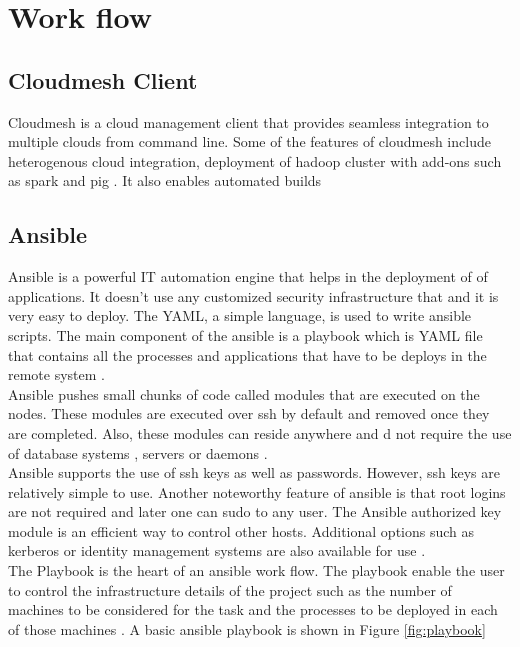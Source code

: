 \documentclass[9pt,twocolumn,twoside]{../../styles/osajnl}
\begin{document}
\section{Work flow}

\subsection{Cloudmesh Client}
Cloudmesh is a cloud management client that provides seamless integration to multiple clouds from command line. Some of the features of cloudmesh include heterogenous cloud integration, deployment of hadoop cluster with add-ons such as spark and pig \cite{www-cm-git}. It also enables automated builds 

\subsection{Ansible}
Ansible is a powerful IT automation engine that helps in the deployment of of applications. It doesn't use any customized security infrastructure that and it is very easy to deploy. The YAML, a simple language, is used to write ansible scripts. The main component of the ansible is a playbook which is YAML file that contains all the processes and applications that have to be deploys in the remote system \cite{www-ansible}. \\
Ansible pushes small chunks of code called modules that are executed on the nodes. These modules are executed over ssh by default and removed once they are completed. Also, these modules can reside anywhere and d not require the use of database systems , servers or daemons \cite{www-ansible}.\\
Ansible supports the use of ssh keys as well as passwords. However, ssh keys are relatively simple to use. Another noteworthy feature of ansible is that root logins are not required and later one can sudo to any user. The Ansible authorized key module is an efficient way to control other hosts. Additional options such as kerberos or identity management systems are also available for use \cite{www-ansible}. \\
The Playbook is the heart of an ansible work flow. The playbook enable the user to control the infrastructure details of the project such as the number of machines to be considered for the task and the processes to be deployed in each of those machines \cite{www-ansible}. A basic ansible playbook is shown in Figure \ref{fig:playbook} 
\end{document}

